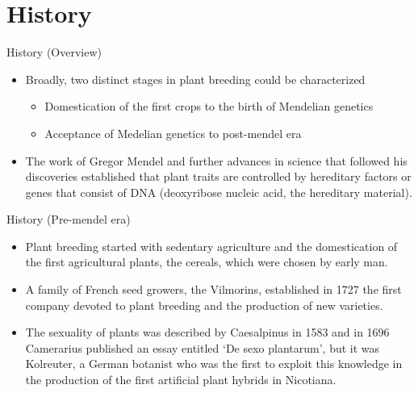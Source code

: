 \documentclass[11pt,ignorenonframetext,aspectratio=169]{beamer}
\providecommand{\tightlist}{%
  \setlength{\itemsep}{0pt}\setlength{\parskip}{0pt}}
\newcommand{\ecolumns}{\end{columns}}
\begin{document}

\hypertarget{history}{%
\section{History}\label{history}}

\begin{frame}{History (Overview)}
\protect\hypertarget{history-overview}{}
\begin{itemize}
\tightlist
\item
  Broadly, two distinct stages in plant breeding could be characterized

  \begin{itemize}
  \tightlist
  \item
    Domestication of the first crops to the birth of Mendelian genetics
  \item
    Acceptance of Medelian genetics to post-mendel era
  \end{itemize}
\item
  The work of Gregor Mendel and further advances in science that
  followed his discoveries established that plant traits are controlled
  by hereditary factors or genes that consist of DNA (deoxyribose
  nucleic acid, the hereditary material).
\end{itemize}
\end{frame}

\begin{frame}{History (Pre-mendel era)}
\protect\hypertarget{history-pre-mendel-era}{}
\begin{itemize}
\tightlist
\item
  Plant breeding started with sedentary agriculture and the
  domestication of the first agricultural plants, the cereals, which
  were chosen by early man.
\item
  A family of French seed growers, the Vilmorins, established in 1727
  the first company devoted to plant breeding and the production of new
  varieties.
\item
  The sexuality of plants was described by Caesalpinus in 1583 and in
  1696 Camerarius published an essay entitled `De sexo plantarum', but
  it was Kolreuter, a German botanist who was the first to exploit this
  knowledge in the production of the first artificial plant hybrids in
  Nicotiana.
\end{itemize}
\end{frame}
\end{document}
